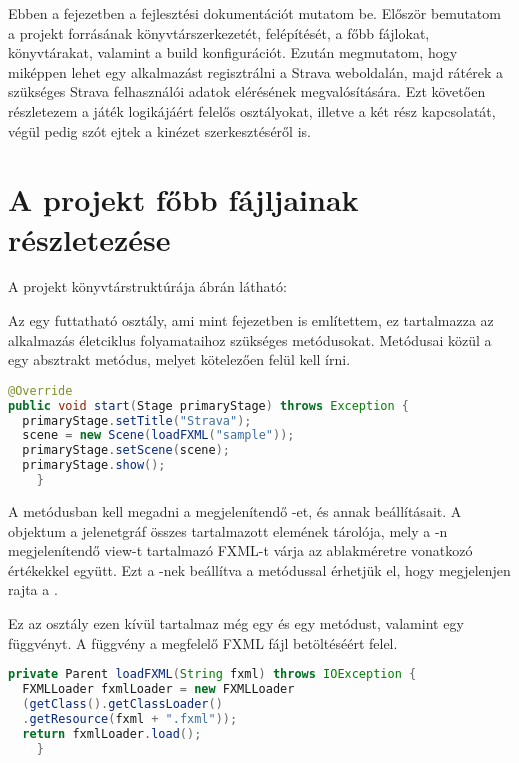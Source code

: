 Ebben a fejezetben a fejlesztési dokumentációt mutatom be.
Először bemutatom a projekt forrásának könyvtárszerkezetét, felépítését, a főbb fájlokat, könyvtárakat, valamint a build konfigurációt.
Ezután megmutatom, hogy miképpen lehet egy alkalmazást regisztrálni a Strava weboldalán, majd rátérek  a szükséges Strava felhasználói adatok elérésének megvalósítására.
Ezt követően részletezem a játék logikájáért felelős osztályokat, illetve a két rész kapcsolatát, végül pedig szót ejtek a kinézet szerkesztéséről is.

\section{A projekt főbb fájljainak részletezése}\label{fobbFajlok}


A projekt könyvtárstruktúrája  ábrán látható:


Az  egy futtatható osztály, ami mint  fejezetben is említettem, ez tartalmazza az alkalmazás életciklus folyamataihoz szükséges metódusokat.
Metódusai közül a  egy absztrakt metódus, melyet kötelezően felül kell írni.


\begin{lstlisting}[language=Java]
@Override
public void start(Stage primaryStage) throws Exception {
  primaryStage.setTitle("Strava");
  scene = new Scene(loadFXML("sample"));
  primaryStage.setScene(scene);
  primaryStage.show();
    }
\end{lstlisting}
 
A  metódusban kell megadni a megjelenítendő -et, és annak beállításait.
A  objektum a jelenetgráf összes tartalmazott elemének tárolója, mely a -n megjelenítendő view-t tartalmazó FXML-t várja az ablakméretre vonatkozó értékekkel együtt.
Ezt a -nek beállítva a  metódussal érhetjük el, hogy megjelenjen rajta a .

Ez az osztály ezen kívül tartalmaz még egy  és egy  metódust, valamint egy  függvényt.
A  függvény a megfelelő FXML fájl betöltéséért felel.

\begin{lstlisting}[language=Java]
private Parent loadFXML(String fxml) throws IOException {
  FXMLLoader fxmlLoader = new FXMLLoader
  (getClass().getClassLoader()
  .getResource(fxml + ".fxml"));
  return fxmlLoader.load();
    } 
\end{lstlisting}
 
